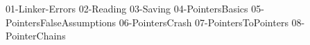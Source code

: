 {01-Linker-Errors}
{02-Reading}
{03-Saving}
{04-PointersBasics}
{05-PointersFalseAssumptions}
{06-PointersCrash}
{07-PointersToPointers}
{08-PointerChains}